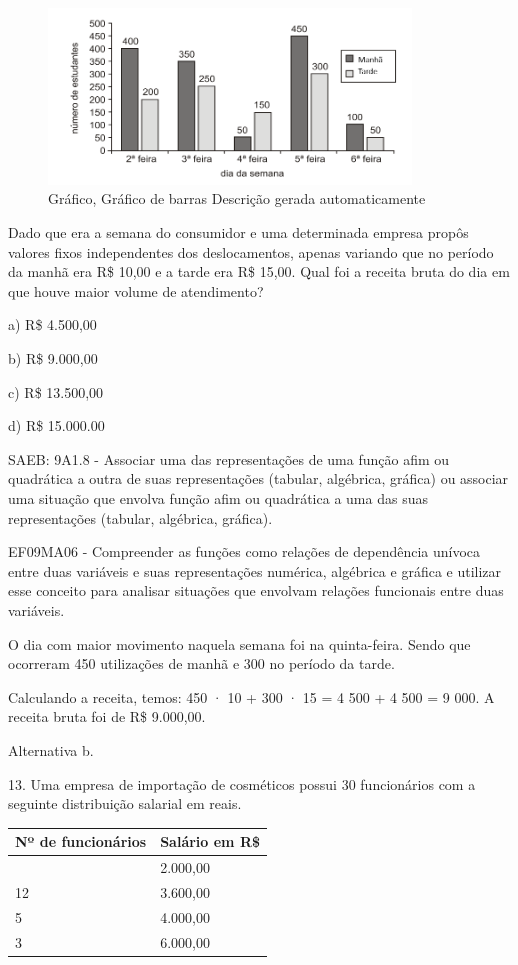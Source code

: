 \begin{escolha}
{{{\begin{escolha}
{{{{{\begin{escolha}
\begin{escolha}
{\begin{q°}
\begin{figure}
\centering
\includegraphics[width=3.79687in,height=1.84263in]{./_SAEB_9_MAT/media/image258.png}
\caption{Gráfico, Gráfico de barras Descrição gerada automaticamente}
\end{figure}

Dado que era a semana do consumidor e uma determinada empresa propôs
valores fixos independentes dos deslocamentos, apenas variando que no
período da manhã era R\$ 10,00 e a tarde era R\$ 15,00. Qual foi a
receita bruta do dia em que houve maior volume de atendimento?

a) R\$ 4.500,00

b) R\$ 9.000,00

c) R\$ 13.500,00

d) R\$ 15.000.00

SAEB: 9A1.8 - Associar uma das representações de uma função afim ou
quadrática a outra de suas representações (tabular, algébrica, gráfica)
ou associar uma situação que envolva função afim ou quadrática a uma das
suas representações (tabular, algébrica, gráfica).

EF09MA06 - Compreender as funções como relações de dependência unívoca
entre duas variáveis e suas representações numérica, algébrica e gráfica
e utilizar esse conceito para analisar situações que envolvam relações
funcionais entre duas variáveis.

O dia com maior movimento naquela semana foi na quinta-feira. Sendo que
ocorreram 450 utilizações de manhã e 300 no período da tarde.

Calculando a receita, temos: 450 · 10 + 300 · 15 = 4 500 + 4 500 = 9
000. A receita bruta foi de R\$ 9.000,00.

Alternativa b.

13. Uma empresa de importação de cosméticos possui 30 funcionários com a
seguinte distribuição salarial em reais.

\begin{longtable}[]{@{}ll@{}}
\toprule\noalign{}
Nº de funcionários & Salário em R\$ \\
\midrule\noalign{}
\endhead
\bottomrule\noalign{}
\endlastfoot
10 & 2.000,00 \\
12 & 3.600,00 \\
5 & 4.000,00 \\
3 & 6.000,00 \\
\end{longtable}


\end{q°}}
\end{escolha}
\end{escolha}}}}}}
\end{escolha}}}}
\end{escolha}

